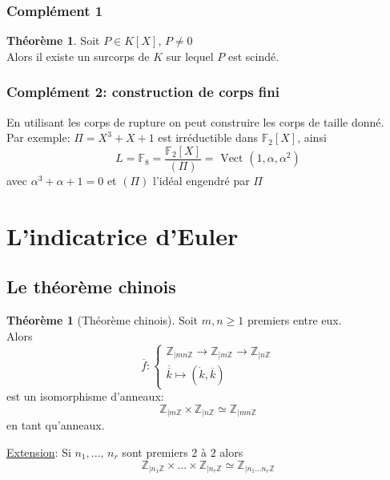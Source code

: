 \documentclass[10pt,a4paper]{article}
\theoremstyle{definition}
\newtheorem{theorem}[proposition]{Théorème}
\begin{document}
\subsubsection{Complément 1}
\begin{theorem}
Soit $P \in K[X]$, $P \neq 0$ \\
Alors il existe un surcorps de $K$ sur lequel $P$ est scindé.
\end{theorem}

\subsubsection{Complément 2: construction de corps fini}
\noindent En utilisant les corps de rupture on peut construire les corps de taille donné. \\
Par exemple: $\Pi = X^3 + X + 1$ est irréductible dans $\mathbb{F}_2[X]$, ainsi
\[ L = \mathbb{F}_8 = \frac{\mathbb{F}_2[X]}{(\Pi)} = \text{ Vect }(1, \alpha, \alpha^2) \]
avec $\alpha^3 + \alpha + 1 = 0$ et $(\Pi)$ l'idéal engendré par $\Pi$

\section{L'indicatrice d'Euler}
\subsection{Le théorème chinois}
\begin{theorem}[Théorème chinois]
Soit $m, n \geq 1$ premiers entre eux. \\
Alors 
\[ \overline{f} : \begin{cases}
\mathbb{Z}_{|mn\mathbb{Z}} \to \mathbb{Z}_{|m\mathbb{Z}} \to \mathbb{Z}_{|n\mathbb{Z}} \\
\overline{\overline{k}} \mapsto (\dot{k}, \overline{k})
\end{cases} \]
est un isomorphisme d'anneaux: 
\[ \mathbb{Z}_{|m\mathbb{Z}} \times \mathbb{Z}_{|n\mathbb{Z}} \simeq \mathbb{Z}_{|mn\mathbb{Z}} \]
en tant qu'anneaux.
\end{theorem}
\noindent \uline{Extension}: Si $n_1, ...,\, n_r$ sont premiers $2$ à $2$ alors
\[ \mathbb{Z}_{|n_1 \mathbb{Z}} \times ... \times \mathbb{Z}_{|n_r \mathbb{Z}} \simeq \mathbb{Z}_{|n_1 ... n_r \mathbb{Z}} \]
\end{document}
